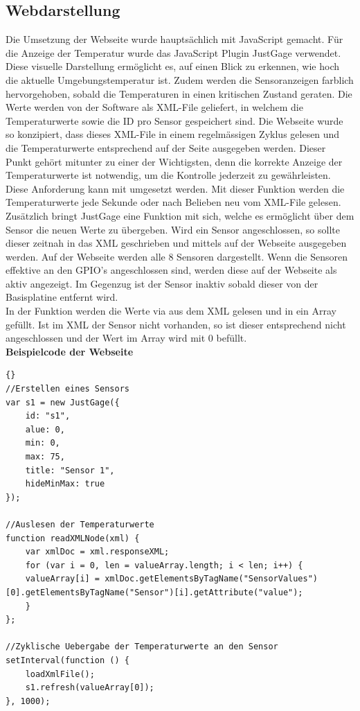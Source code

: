 \subsection{Webdarstellung}
Die Umsetzung der Webseite wurde hauptsächlich mit JavaScript gemacht.
Für die Anzeige der Temperatur wurde das JavaScript Plugin JustGage verwendet. Diese visuelle Darstellung ermöglicht es, auf einen Blick zu erkennen, wie hoch die aktuelle Umgebungstemperatur ist. Zudem werden die Sensoranzeigen farblich hervorgehoben, sobald die Temperaturen in einen kritischen Zustand geraten. 
Die Werte werden von der Software als XML-File geliefert, in welchem die Temperaturwerte sowie die ID pro Sensor gespeichert sind. Die Webseite wurde so konzipiert, dass dieses XML-File in einem regelmässigen Zyklus gelesen und die Temperaturwerte entsprechend auf der Seite ausgegeben werden. Dieser Punkt gehört mitunter zu einer der Wichtigsten, denn die korrekte Anzeige der Temperaturwerte ist notwendig, um die Kontrolle jederzeit zu gewährleisten. Diese Anforderung kann mit  umgesetzt werden. Mit dieser Funktion werden die Temperaturwerte jede Sekunde oder nach Belieben neu vom XML-File gelesen.
Zusätzlich bringt JustGage eine Funktion mit sich, welche es ermöglicht über  dem Sensor die neuen Werte zu übergeben. Wird ein Sensor angeschlossen, so sollte dieser zeitnah in das XML geschrieben und mittels  auf der Webseite ausgegeben werden. Auf der Webseite werden alle 8 Sensoren dargestellt. Wenn die Sensoren effektive an den GPIO's angeschlossen sind,  werden diese auf der Webseite als \grqq{}aktiv\glqq{} angezeigt. Im Gegenzug ist der Sensor \grqq{}inaktiv\glqq{} sobald dieser von der Basisplatine entfernt wird.\\
In der Funktion  werden die Werte via  aus dem XML gelesen und in ein Array gefüllt. Ist im XML der Sensor nicht vorhanden, so ist dieser entsprechend nicht angeschlossen und der Wert im Array wird mit 0 befüllt.\\

\textbf{Beispielcode der Webseite}

\begin{lstlisting}{}
//Erstellen eines Sensors
var s1 = new JustGage({
	id: "s1",
	alue: 0,
	min: 0,
	max: 75,
	title: "Sensor 1",
	hideMinMax: true
});

//Auslesen der Temperaturwerte
function readXMLNode(xml) {
	var xmlDoc = xml.responseXML;
	for (var i = 0, len = valueArray.length; i < len; i++) {
	valueArray[i] = xmlDoc.getElementsByTagName("SensorValues")[0].getElementsByTagName("Sensor")[i].getAttribute("value");
	}
};

//Zyklische Uebergabe der Temperaturwerte an den Sensor
setInterval(function () {
	loadXmlFile();
	s1.refresh(valueArray[0]);
}, 1000);
\end{lstlisting}

